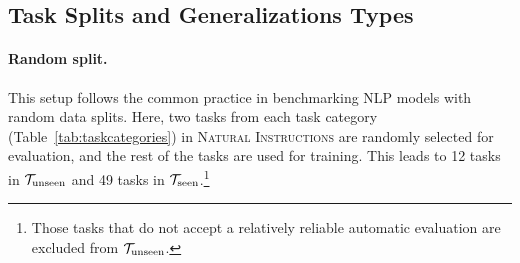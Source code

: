 \subsection{Task Splits and Generalizations Types}
\label{subsec:split}

\paragraph{Random split.} This setup follows the common practice in benchmarking NLP models with random data splits. Here, two tasks from each task category (Table~\ref{tab:taskcategories}) in \textsc{Natural Instructions} are randomly selected for evaluation, and the rest of the tasks are used for training. This leads to 12 tasks in $\mathcal{T}_{\textnormal{unseen}}$ and 49 tasks in $\mathcal{T}_{\textnormal{seen}}$.\footnote{Those tasks that do not accept a relatively reliable automatic evaluation are excluded from $\mathcal{T}_{\textnormal{unseen}}$. } 

